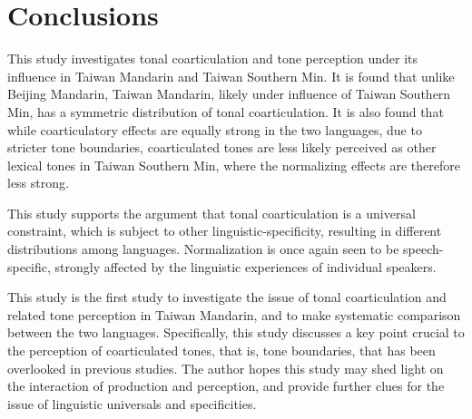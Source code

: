 
\chapter{Conclusions}

This study investigates tonal coarticulation and tone perception under its influence in Taiwan Mandarin and Taiwan Southern Min. It is found that unlike Beijing Mandarin, Taiwan Mandarin, likely under influence of Taiwan Southern Min, has a symmetric distribution of tonal coarticulation. It is also found that while coarticulatory effects are equally strong in the two languages, due to stricter tone boundaries, coarticulated tones are less likely perceived as other lexical tones in Taiwan Southern Min, where the normalizing effects are therefore less strong.

This study supports the argument that tonal coarticulation is a universal constraint, which is subject to other linguistic-specificity, resulting in different distributions among languages. Normalization is once again seen to be speech-specific, strongly affected by the linguistic experiences of individual speakers.

This study is the first study to investigate the issue of tonal coarticulation and related tone perception in Taiwan Mandarin, and to make systematic comparison between the two languages. Specifically, this study discusses a key point crucial to the perception of coarticulated tones, that is, tone boundaries, that has been overlooked in previous studies. The author hopes this study may shed light on the interaction of production and perception, and provide further clues for the issue of linguistic universals and specificities. 
